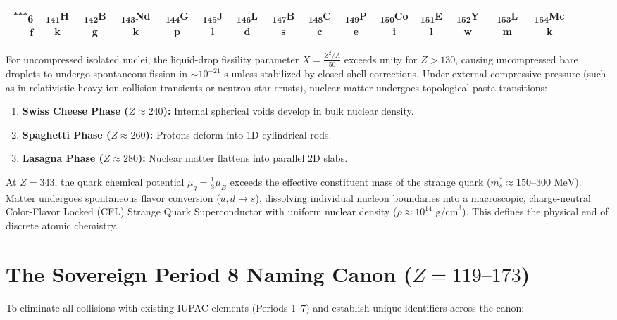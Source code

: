 \documentclass[10pt,twocolumn,a4paper]{article}
\begin{document}
\begin{table}[t]
\begin{tabular}{rcccccccccccccccccc}
\textsuperscript{***}6f & \textsubscript{141}Hk & \textsubscript{142}Bg & \textsubscript{143}Ndk & \textsubscript{144}Gp & \textsubscript{145}Jl & \textsubscript{146}Ld & \textsubscript{147}Bs & \textsubscript{148}Cc & \textsubscript{149}Pe & \textsubscript{150}Coi & \textsubscript{151}El & \textsubscript{152}Yw & \textsubscript{153}Lm & \textsubscript{154}Mck & & & & \\
\bottomrule
\end{tabular}
\end{table}

For uncompressed isolated nuclei, the liquid-drop fissility parameter $X = \frac{Z^2/A}{50}$ exceeds unity for $Z > 130$, causing uncompressed bare droplets to undergo spontaneous fission in $\sim 10^{-21}\text{ s}$ unless stabilized by closed shell corrections. Under external compressive pressure (such as in relativistic heavy-ion collision transients or neutron star crusts), nuclear matter undergoes topological pasta transitions:
\begin{enumerate}\itemsep=0pt
\item \textbf{Swiss Cheese Phase ($Z \approx 240$):} Internal spherical voids develop in bulk nuclear density.
\item \textbf{Spaghetti Phase ($Z \approx 260$):} Protons deform into 1D cylindrical rods.
\item \textbf{Lasagna Phase ($Z \approx 280$):} Nuclear matter flattens into parallel 2D slabs.
\end{enumerate}

At $Z = 343$, the quark chemical potential $\mu_q = \frac{1}{3}\mu_B$ exceeds the effective constituent mass of the strange quark ($m_s^* \approx 150\text{--}300\text{ MeV}$). Matter undergoes spontaneous flavor conversion ($u, d \to s$), dissolving individual nucleon boundaries into a macroscopic, charge-neutral Color-Flavor Locked (CFL) Strange Quark Superconductor with uniform nuclear density ($\rho \approx 10^{14}\text{ g/cm}^3$). This defines the physical end of discrete atomic chemistry.

\section{\texorpdfstring{The Sovereign Period 8 Naming Canon ($Z = 119\text{--}173$)}{The Sovereign Period 8 Naming Canon (Z = 119-173)}}

To eliminate all collisions with existing IUPAC elements (Periods 1–7) and establish unique identifiers across the canon:
\end{document}
